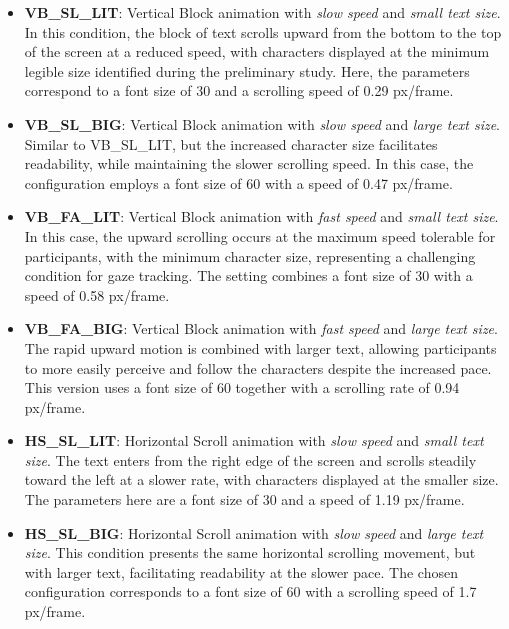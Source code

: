 \documentclass{article}
\begin{document}
\begin{itemize}
    \item \textbf{VB\_SL\_LIT}: Vertical Block animation with \emph{slow speed} and \emph{small text size}. 
    In this condition, the block of text scrolls upward from the bottom to the top of the screen at a reduced speed, with characters displayed at the minimum legible size identified during the preliminary study.
    Here, the parameters correspond to a font size of 30 and a scrolling speed of 0.29 px/frame.

    \item \textbf{VB\_SL\_BIG}: Vertical Block animation with \emph{slow speed} and \emph{large text size}. 
    Similar to VB\_SL\_LIT, but the increased character size facilitates readability, while maintaining the slower scrolling speed. 
    In this case, the configuration employs a font size of 60 with a speed of 0.47 px/frame. 

    \item \textbf{VB\_FA\_LIT}: Vertical Block animation with \emph{fast speed} and \emph{small text size}. 
    In this case, the upward scrolling occurs at the maximum speed tolerable for participants, with the minimum character size, representing a challenging condition for gaze tracking.  
    The setting combines a font size of 30 with a speed of 0.58 px/frame.

    \item \textbf{VB\_FA\_BIG}: Vertical Block animation with \emph{fast speed} and \emph{large text size}. 
    The rapid upward motion is combined with larger text, allowing participants to more easily perceive and follow the characters despite the increased pace.  
    This version uses a font size of 60 together with a scrolling rate of 0.94 px/frame. 

    \item \textbf{HS\_SL\_LIT}: Horizontal Scroll animation with \emph{slow speed} and \emph{small text size}. 
    The text enters from the right edge of the screen and scrolls steadily toward the left at a slower rate, with characters displayed at the smaller size.  
    The parameters here are a font size of 30 and a speed of 1.19 px/frame. 

    \item \textbf{HS\_SL\_BIG}: Horizontal Scroll animation with \emph{slow speed} and \emph{large text size}. 
    This condition presents the same horizontal scrolling movement, but with larger text, facilitating readability at the slower pace. 
    The chosen configuration corresponds to a font size of 60 with a scrolling speed of 1.7 px/frame. 


\end{itemize}
\end{document}
